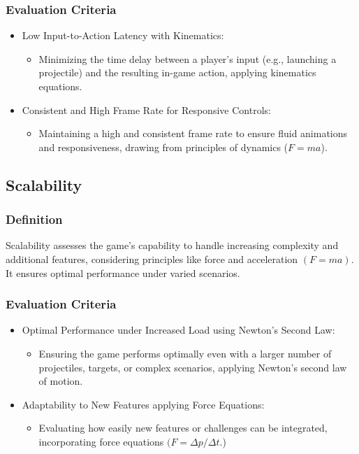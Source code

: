 \documentclass[12pt, titlepage]{article}
\begin{document}
\subsubsection{Evaluation Criteria}
\begin{itemize}
    \item Low Input-to-Action Latency with Kinematics:
        \begin{itemize}
            \item Minimizing the time delay between a player's input (e.g., launching a projectile) and the resulting in-game action, applying kinematics equations.
        \end{itemize}
      \item Consistent and High Frame Rate for Responsive Controls:
        \begin{itemize}
            \item Maintaining a high and consistent frame rate to ensure fluid animations and responsiveness, drawing from principles of dynamics ($F = ma$).
        \end{itemize}
	
\end{itemize}

\subsection{Scalability}
    \subsubsection{Definition}
Scalability assesses the game's capability to handle increasing complexity and additional features, considering principles like force and acceleration $(F = ma)$. It ensures optimal performance under varied scenarios.
\subsubsection{Evaluation Criteria}
\begin{itemize}
    \item Optimal Performance under Increased Load using Newton's Second Law:
       \begin{itemize}
           \item Ensuring the game performs optimally even with a larger number of projectiles, targets, or complex scenarios, applying Newton's second law of motion.
       \end{itemize} 
       \item Adaptability to New Features applying Force Equations:
        \begin{itemize}
            \item Evaluating how easily new features or challenges can be integrated, incorporating force equations $(F = \Delta p/\Delta t$.)
        \end{itemize}
\end{itemize}
\end{document}
